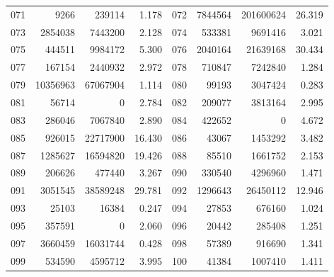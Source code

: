 \begin{longtable}{lrrr@{\hspace{16bp}}lrrr}
071 & 9266 & 239114 & 1.178 & 072 & 7844564 & 201600624 & 26.319\\
073 & 2854038 & 7443200 & 2.128 & 074 & 533381 & 9691416 & 3.021\\
075 & 444511 & 9984172 & 5.300 & 076 & 2040164 & 21639168 & 30.434\\
077 & 167154 & 2440932 & 2.972 & 078 & 710847 & 7242840 & 1.284\\
079 & 10356963 & 67067904 & 1.114 & 080 & 99193 & 3047424 & 0.283\\
081 & 56714 & 0 & 2.784 & 082 & 209077 & 3813164 & 2.995\\
083 & 286046 & 7067840 & 2.890 & 084 & 422652 & 0 & 4.672\\
085 & 926015 & 22717900 & 16.430 & 086 & 43067 & 1453292 & 3.482\\
087 & 1285627 & 16594820 & 19.426 & 088 & 85510 & 1661752 & 2.153\\
089 & 206626 & 477440 & 3.267 & 090 & 330540 & 4296960 & 1.471\\
091 & 3051545 & 38589248 & 29.781 & 092 & 1296643 & 26450112 & 12.946\\
093 & 25103 & 16384 & 0.247 & 094 & 27853 & 676160 & 1.024\\
095 & 357591 & 0 & 2.060 & 096 & 20442 & 285408 & 1.251\\
097 & 3660459 & 16031744 & 0.428 & 098 & 57389 & 916690 & 1.341\\
099 & 534590 & 4595712 & 3.995 & 100 & 41384 & 1007410 & 1.411\\
\end{longtable}

